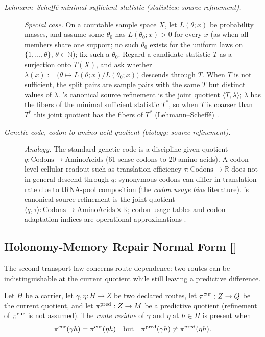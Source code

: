 \begin{description}
\item[\emph{Lehmann--Scheff\'e minimal sufficient statistic
(statistics; source refinement).}] \textit{Special case.}
On a countable sample space \(X\), let \(L(\theta;x)\) be probability
masses, and assume some \(\theta_0\) has \(L(\theta_0;x)>0\) for every \(x\) (as when all members share one support; no such \(\theta_0\) exists for the uniform laws on \(\{1,\dots,\theta\}\), \(\theta\in\mathbb N\)); fix such a \(\theta_0\).
Regard a candidate statistic \(T\) as a surjection onto \(T(X)\), and ask
whether \(\lambda(x):=\bigl(\theta\mapsto L(\theta;x)/L(\theta_0;x)\bigr)\)
descends through \(T\). When \(T\) is not sufficient, the  split pairs are sample
pairs with the same \(T\) but distinct values of \(\lambda\). 's
canonical source refinement is the joint quotient \(\langle T,\lambda\rangle\);
\(\lambda\) has the fibers of the minimal sufficient statistic \(T^{*}\), so
when \(T\) is coarser than \(T^{*}\) this joint quotient has the fibers of
\(T^{*}\) (Lehmann--Scheff\'e)
\citep{LehmannScheffe1950Completeness}.

\item[\emph{Genetic code, codon-to-amino-acid quotient (biology;
source refinement).}] \textit{Analogy.}
The standard genetic code is a discipline-given quotient
\(q : \mathrm{Codons} \to \mathrm{AminoAcids}\) (61 sense codons
to 20 amino acids). A codon-level cellular readout such as
translation efficiency \(\tau : \mathrm{Codons} \to \mathbb{R}\)
does not in general descend through \(q\): synonymous codons can
differ in translation rate due to tRNA-pool composition (the
\emph{codon usage bias} literature). 's canonical source
refinement is the joint quotient
\(\langle q, \tau\rangle : \mathrm{Codons} \to \mathrm{AminoAcids}
\times \mathbb{R}\); codon usage tables and codon-adaptation
indices are operational approximations \citep{Crick1968GeneticCode}.
\end{description}
\endgroup

\subsection{Holonomy-Memory Repair Normal Form [\texorpdfstring{}{F3}]}\label{sec:transport:holonomy-memory}

The second transport law concerns route dependence: two routes can be
indistinguishable at the current quotient while still leaving a
predictive difference.

\begin{definition}\label{def:route-residue}
Let \(H\) be a carrier, let \(\gamma,\eta:H\to Z\) be two declared
routes, let \(\pi^{\mathrm{cur}}:Z\to Q\) be the current quotient, and let
\(\pi^{\mathrm{pred}}:Z\to M\) be a predictive quotient (refinement of \(\pi^{\mathrm{cur}}\) is not
assumed).  The \emph{route residue} of \(\gamma\) and \(\eta\) at
\(h\in H\) is present when
\[
  \pi^{\mathrm{cur}}(\gamma h)=\pi^{\mathrm{cur}}(\eta h)
  \quad\text{but}\quad
  \pi^{\mathrm{pred}}(\gamma h)\ne\pi^{\mathrm{pred}}(\eta h).
\]
\end{definition}

